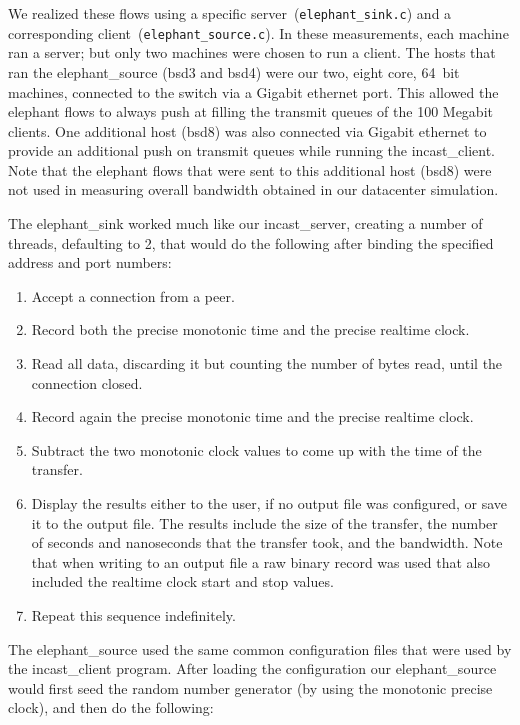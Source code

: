 \documentclass[12pt]{article}
\begin{document}
We realized these flows using a specific server~(\texttt{elephant\_sink.c}) and a corresponding client~(\texttt{elephant\_source.c}).
In these measurements, each machine ran a server;
but only two machines were chosen to run a client. The hosts
that ran the elephant\_source (bsd3 and bsd4) were our two, eight core, 64~bit machines, connected to the switch
via a Gigabit ethernet port. This allowed the elephant flows to always push at filling the transmit queues
of the 100 Megabit clients. One additional host (bsd8) was also connected via Gigabit ethernet to provide
an additional push on transmit queues while running the incast\_client. Note that the elephant flows that
were sent to this additional host (bsd8) were not used in measuring overall bandwidth obtained 
in our datacenter simulation.

The elephant\_sink worked much like our incast\_server, creating a
number of threads, defaulting to 2, that
would do the following after binding the specified address and port numbers:
\begin{enumerate}

\item Accept a connection from a peer.

\item Record both the precise monotonic time and the precise realtime clock.

\item Read all data, discarding it but counting the number of bytes read, until the connection closed.

\item Record again the precise monotonic time and the precise realtime clock.

\item Subtract the two monotonic clock values to come up with the time of the transfer.

\item Display the results either to the user, if no output file was configured, or save
it to the output file. The results include the size of the transfer, the number of seconds and nanoseconds
that the transfer took, and the bandwidth. Note that when writing to an output file a raw binary record
was used that also included the realtime clock start and stop values.

\item Repeat this sequence indefinitely.

\end{enumerate}


The elephant\_source used the same common configuration files that were used by the incast\_client program.
After loading the configuration our elephant\_source would first
seed the random number generator (by using the monotonic precise clock), and then
do the following:
\end{document}
